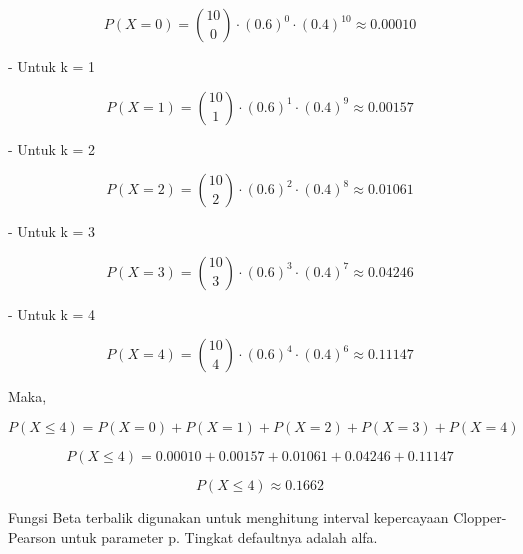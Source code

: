 \documentclass[a4paper,10pt]{article}
\begin{document}
\begin{eulernotebook}
\begin{eulercomment}
\begin{eulercomment}
\begin{eulerformula}
\[
P(X=0)= \binom{10}{0} \cdot (0.6)^{0} \cdot (0.4)^{10} \approx 0.00010
\]
\end{eulerformula}
\begin{eulercomment}
- Untuk k = 1\\
\end{eulercomment}
\begin{eulerformula}
\[
P(X = 1)= \binom{10}{1} \cdot (0.6)^{1} \cdot (0.4)^{9} \approx 0.00157
\]
\end{eulerformula}
\begin{eulercomment}
- Untuk k = 2\\
\end{eulercomment}
\begin{eulerformula}
\[
P(X = 2)= \binom{10}{2} \cdot (0.6)^{2} \cdot (0.4)^{8} \approx 0.01061
\]
\end{eulerformula}
\begin{eulercomment}
- Untuk k = 3\\
\end{eulercomment}
\begin{eulerformula}
\[
P(X = 3)= \binom{10}{3} \cdot (0.6)^{3} \cdot (0.4)^{7} \approx 0.04246
\]
\end{eulerformula}
\begin{eulercomment}
- Untuk k = 4\\
\end{eulercomment}
\begin{eulerformula}
\[
P(X = 4)= \binom{10}{4} \cdot (0.6)^{4} \cdot (0.4)^{6} \approx 0.11147
\]
\end{eulerformula}
\begin{eulercomment}
Maka,\\
\end{eulercomment}
\begin{eulerformula}
\[
P(X \leq 4)= P(X=0)+P(X=1)+P(X=2)+P(X=3)+P(X=4)
\]
\end{eulerformula}
\begin{eulerformula}
\[
P(X \leq 4)= 0.00010 + 0.00157 + 0.01061+ 0.04246+ 0.11147
\]
\end{eulerformula}
\begin{eulerformula}
\[
P(X \leq 4)\approx 0.1662
\]
\end{eulerformula}
\begin{eulercomment}
Fungsi Beta terbalik digunakan untuk menghitung interval kepercayaan
Clopper-Pearson untuk parameter p. Tingkat defaultnya adalah alfa.


\end{eulercomment}
\end{eulercomment}
\end{eulercomment}
\end{eulernotebook}
\end{document}
